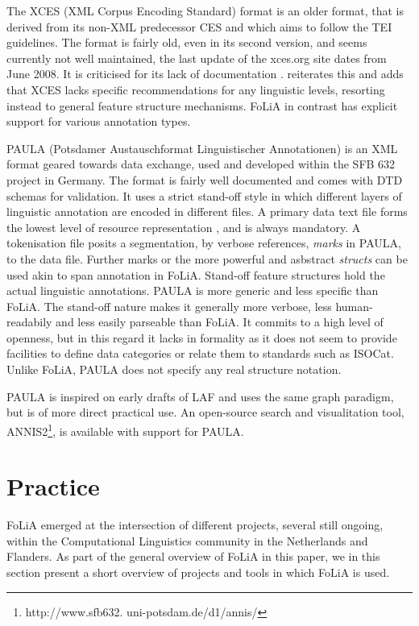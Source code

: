 \documentclass[a4paper,10pt,twoside]{article}
\begin{document}
The XCES (XML Corpus Encoding Standard) format is an older format, that is
derived from its non-XML predecessor CES \cite{XCES} and which aims to follow the TEI
guidelines. The format is fairly old, even in its second version, and seems
currently not well maintained, the last update of the xces.org site dates from
June 2008. It is criticised for its lack of documentation \cite{TEICORPUSANNOT}. \cite{prze09}
reiterates this and adds that XCES lacks specific recommendations for any
linguistic levels, resorting instead to general feature structure mechanisms.
FoLiA in contrast has explicit support for various annotation types.

PAULA (Potsdamer Austauschformat Linguistischer Annotationen) is an XML format
geared towards data exchange, used and developed within the SFB 632 project in
Germany. The format is fairly well documented and comes with DTD schemas for
validation. It uses a strict stand-off style in which different layers of
linguistic annotation are encoded in different files. A primary data text file
forms the lowest level of resource representation \cite{PAULA}, and is always
mandatory. A tokenisation file posits a segmentation, by verbose references,
\emph{marks} in PAULA, to the data file. Further marks or the more powerful and
asbstract \emph{structs} can be used akin to span annotation in FoLiA.
Stand-off feature structures hold the actual linguistic annotations. PAULA is
more generic and less specific than FoLiA. The stand-off nature makes it
generally more verbose, less human-readabily and less easily parseable than
FoLiA. It commits to a high level of openness, but in this regard it lacks in
formality as it does not seem to provide facilities to define data categories
or relate them to standards such as ISOCat.  Unlike FoLiA, PAULA does not
specify any real structure notation.

PAULA is inspired on early drafts of LAF and uses the same graph paradigm, but is of more direct practical use. An
open-source search and visualitation tool, ANNIS2\footnote{http://www.sfb632.
uni-potsdam.de/d1/annis/}, is available with support for
PAULA.


\section{Practice}
\label{sec:practice}

FoLiA emerged at the intersection of different projects, several still ongoing, within the Computational
Linguistics community in the Netherlands and Flanders. As part of the general overview of FoLiA in this paper, we in
this section present a short overview of projects and tools in which FoLiA is
used.
 
\end{document}
